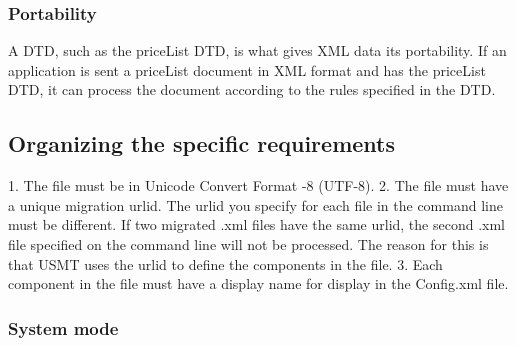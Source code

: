 \subsubsection{Portability}

A DTD, such as the priceList DTD, is what gives XML data its portability. If an application is sent a priceList document in XML format and has the priceList DTD, 
it can process the document according to the rules specified in the DTD.


\subsection{Organizing the specific requirements}
1. The file must be in Unicode Convert Format -8 (UTF-8).
2. The file must have a unique migration urlid. The urlid you specify for each file in the command line must be different. If two migrated .xml files have the same urlid, the second .xml file specified on the command line will not be processed. The reason for this is that USMT uses the urlid to define the components in the file.
3. Each component in the file must have a display name for display in the Config.xml file.



\subsubsection{System mode}

